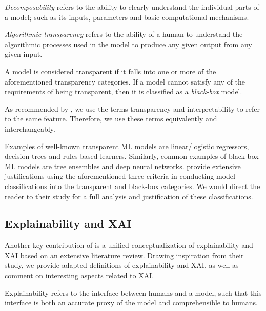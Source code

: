 \begin{remark}
  \textit{Decomposability} refers to the ability to clearly understand the individual parts of a model; such as its inputs, parameters and basic computational mechanisms.
\end{remark}

\begin{remark}
  \textit{Algorithmic transparency} refers to the ability of a human to understand the algorithmic processes used in the model to produce any given output from any given input.
\end{remark}

\begin{remark}
  A model is considered transparent if it falls into one or more of the aforementioned transparency categories. If a model cannot satisfy any of the requirements of being transparent, then it is classified as a \textit{black-box} model. 
\end{remark}

\begin{remark}
  \label{rmk:equivalence}
  As recommended by \citet[Page 3, Section 2.1]{arrieta2020explainable}, we use the terms transparency and interpretability to refer to the same feature. Therefore, we use these terms equivalently and interchangeably.
\end{remark}

Examples of well-known transparent ML models are linear/logistic regressors, decision trees and rules-based learners. Similarly, common examples of black-box ML models are tree ensembles and deep neural networks. \citet{arrieta2020explainable} provide extensive justifications using the aforementioned three criteria in conducting model classifications into the transparent and black-box categories. We would direct the reader to their study for a full analysis and justification of these classifications.

\subsection{Explainability and XAI}

Another key contribution of \citet{arrieta2020explainable} is a unified conceptualization of explainability and XAI based on an extensive literature review. Drawing inspiration from their study, we provide adapted definitions of explainability and XAI, as well as comment on interesting aspects related to XAI. 

\begin{definition}
  Explainability refers to the interface between humans and a model, such that this interface is both an accurate proxy of the model and comprehensible to humans. 
\end{definition}

